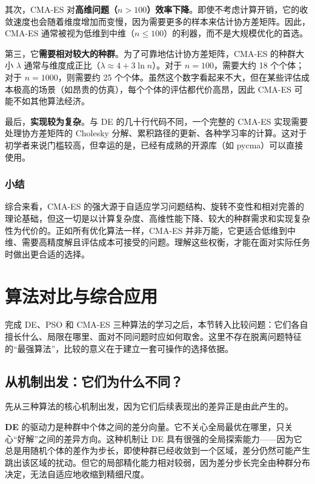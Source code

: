 \documentclass[lang=cn,zihao=-4,a4paper,fontset=windows]{beautybook}
\begin{document}
其次，CMA-ES 对\textbf{高维问题（$n>100$）效率下降}。即使不考虑计算开销，它的收敛速度也会随着维度增加而变慢，因为需要更多的样本来估计协方差矩阵。因此，CMA-ES 通常被视为低维到中维（$n \le 100$）的利器，而不是大规模优化的首选。

第三，它\textbf{需要相对较大的种群}。为了可靠地估计协方差矩阵，CMA-ES 的种群大小 $\lambda$ 通常与维度成正比（$\lambda \approx 4 + 3\ln n$）。对于 $n=100$，需要大约 18 个个体；对于 $n=1000$，则需要约 25 个个体。虽然这个数字看起来不大，但在某些评估成本极高的场景（如昂贵的仿真），每个个体的评估都代价高昂，因此 CMA-ES 可能不如其他算法经济。

最后，\textbf{实现较为复杂}。与 DE 的几十行代码不同，一个完整的 CMA-ES 实现需要处理协方差矩阵的 Cholesky 分解、累积路径的更新、各种学习率的计算。这对于初学者来说门槛较高，但幸运的是，已经有成熟的开源库（如 pycma）可以直接使用。

\subsubsection{小结}

综合来看，CMA-ES 的强大源于自适应学习问题结构、旋转不变性和相对完善的理论基础，但这一切是以计算复杂度、高维性能下降、较大的种群需求和实现复杂性为代价的。正如所有优化算法一样，CMA-ES 并非万能，它更适合低维到中维、需要高精度解且评估成本可接受的问题。理解这些权衡，才能在面对实际任务时做出更合适的选择。



\section{算法对比与综合应用}

完成 DE、PSO 和 CMA-ES 三种算法的学习之后，本节转入比较问题：它们各自擅长什么、局限在哪里、面对不同问题时应如何取舍。这里不存在脱离问题特征的“最强算法”，比较的意义在于建立一套可操作的选择依据。

\subsection{从机制出发：它们为什么不同？}

先从三种算法的核心机制出发，因为它们后续表现出的差异正是由此产生的。

\textbf{DE} 的驱动力是种群中个体之间的差分向量。它不关心全局最优在哪里，只关心“好解”之间的差异方向。这种机制让 DE 具有很强的全局探索能力——因为它总是用随机个体的差作为步长，即使种群已经收敛到一个区域，差分仍然可能产生跳出该区域的扰动。但它的局部精化能力相对较弱，因为差分步长完全由种群分布决定，无法自适应地收缩到精细尺度。
\end{document}
